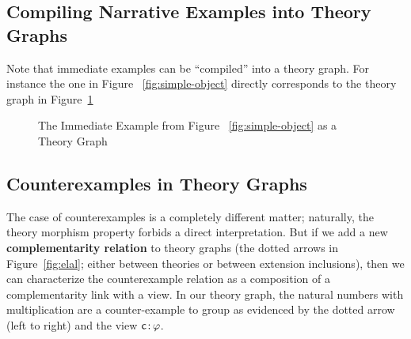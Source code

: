 \documentclass[11pt]{bluenote}
\def\cn#1{\mathsf{#1}}
\def\defemph{\textbf}
\def\thmo#1#2{\cn{#1}\colon\kern-.15em{#2}}
\begin{document}
\subsection{Compiling Narrative Examples into Theory Graphs}

Note that immediate examples can be ``compiled'' into a theory graph. For instance the one
in Figure  ~\ref  {fig:simple-object} directly corresponds to the theory graph in
Figure~\ref{fig:so-tg}
\begin{figure}[ht]\centering
{}
\caption{The Immediate Example from Figure ~\ref {fig:simple-object} as a Theory Graph}\label{fig:so-tg}
\end{figure}

\subsection{Counterexamples in Theory Graphs}

The case of counterexamples is a completely different matter; naturally, the theory
morphism property forbids a direct interpretation. But if we add a new
\defemph{complementarity relation} to theory graphs (the dotted arrows in
Figure~\ref{fig:elal}; either between theories or between extension inclusions), then we
can characterize the counterexample relation as a composition of a complementarity link
with a view. In our theory graph, the natural numbers with multiplication are a
counter-example to group as evidenced by the dotted arrow (left to right) and the view
$\thmo{c}\varphi$.
\end{document}
